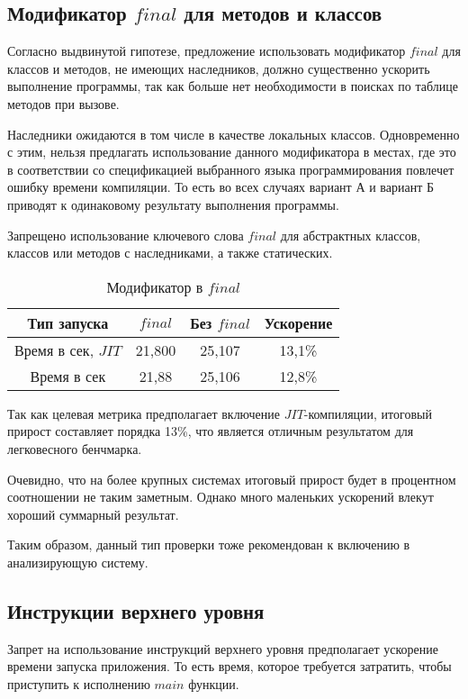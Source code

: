 \documentclass{mipt-thesis-bs}
\begin{document}
\subsection{Модификатор $final$ для методов и классов}

Согласно выдвинутой гипотезе, предложение использовать модификатор
$final$ для классов и методов, не имеющих наследников, должно существенно
ускорить выполнение программы, так как больше нет необходимости в поисках
по таблице методов при вызове.

Наследники ожидаются в том числе в качестве локальных классов. Одновременно с этим,
нельзя предлагать использование данного модификатора в местах, где это в соответствии
со спецификацией выбранного языка программирования повлечет ошибку времени компиляции.
То есть во всех случаях вариант А и вариант Б приводят к одинаковому результату выполнения
программы.

Запрещено использование ключевого слова $final$ для абстрактных классов, классов или методов
с наследниками, а также статических.

\begin{table}[h]
    \centering
    \begin{tabular}{|c|c|c|c|}
      \hline
      Тип запуска & $final$ & Без $final$ & Ускорение \\
      \hline
      Время в сек, $JIT$ & 21,800 & 25,107 & 13,1\% \\
      \hline
      Время в сек & 21,88 & 25,106 & 12,8\% \\
      \hline
    \end{tabular}
    \caption{Модификатор в $final$}
  \end{table}

Так как целевая метрика предполагает включение $JIT$-компиляции, итоговый прирост составляет
порядка 13\%, что является отличным результатом для легковесного бенчмарка.

Очевидно, что на более крупных системах итоговый прирост будет в процентном соотношении не
таким заметным. Однако много маленьких ускорений влекут хороший суммарный результат.

Таким образом, данный тип проверки тоже рекомендован к включению в анализирующую систему.

\subsection{Инструкции верхнего уровня}

Запрет на использование инструкций верхнего уровня предполагает ускорение
времени запуска приложения. То есть время, которое требуется затратить, чтобы
приступить к исполнению $main$ функции.
\end{document}
